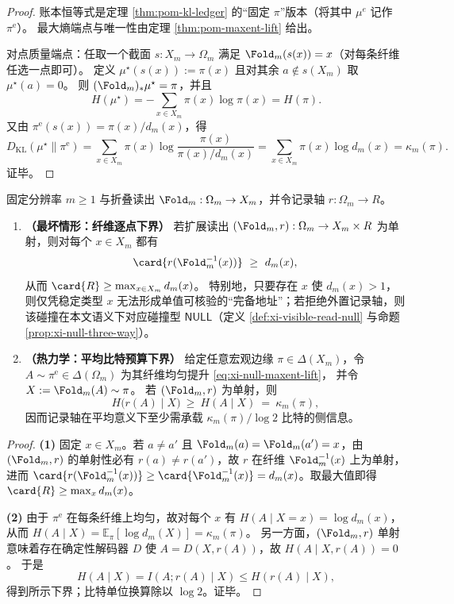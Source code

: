 \begin{proof}
账本恒等式是定理 \ref{thm:pom-kl-ledger} 的“固定 \(\pi\)”版本（将其中 \(\mu^e\) 记作 \(\pi^{\mathrm{e}}\)）。
最大熵端点与唯一性由定理 \ref{thm:pom-maxent-lift} 给出。
\par
对点质量端点：任取一个截面 \(s:X_m\to\Omega_m\) 满足 \(\Fold_m(s(x))=x\)（对每条纤维任选一点即可）。
定义
\(
\mu^\star(s(x)):=\pi(x)
\)
且对其余 \(a\notin s(X_m)\) 取 \(\mu^\star(a)=0\)。
则 \((\Fold_m)_*\mu^\star=\pi\)，并且
\[
H(\mu^\star)=-\sum_{x\in X_m}\pi(x)\log\pi(x)=H(\pi).
\]
又由 \(\pi^{\mathrm{e}}(s(x))=\pi(x)/d_m(x)\)，得
\[
D_{\mathrm{KL}}(\mu^\star\|\pi^{\mathrm{e}})
=\sum_{x\in X_m}\pi(x)\log\frac{\pi(x)}{\pi(x)/d_m(x)}
=\sum_{x\in X_m}\pi(x)\log d_m(x)
=\kappa_m(\pi).
\]
证毕。
\end{proof}

\begin{theorem}\label{thm:address-defect-law}
固定分辨率 \(m\ge 1\) 与折叠读出 \(\Fold_m:\Omega_m\to X_m\)，并令记录轴 \(r:\Omega_m\to R\)。
\begin{enumerate}
  \item \textbf{（最坏情形：纤维逐点下界）}
  若扩展读出 \((\Fold_m,r):\Omega_m\to X_m\times R\) 为单射，则对每个 \(x\in X_m\) 都有
  \[
  \card{r(\Fold_m^{-1}(x))}\ \ge\ d_m(x),
  \]
  从而 \(\card{R}\ge \max_{x\in X_m} d_m(x)\)。
  特别地，只要存在 \(x\) 使 \(d_m(x)>1\)，则仅凭稳定类型 \(x\) 无法形成单值可核验的“完备地址”；若拒绝外置记录轴，则该碰撞在本文语义下对应碰撞型 \(\mathsf{NULL}\)（定义 \ref{def:xi-visible-read-null} 与命题 \ref{prop:xi-null-three-way}）。

  \item \textbf{（热力学：平均比特预算下界）}
  给定任意宏观边缘 \(\pi\in\Delta(X_m)\)，令 \(A\sim\pi^{\mathrm{e}}\in\Delta(\Omega_m)\) 为其纤维均匀提升 \eqref{eq:xi-null-maxent-lift}，
  并令 \(X:=\Fold_m(A)\sim\pi\)。
  若 \((\Fold_m,r)\) 为单射，则
  \[
  H\bigl(r(A)\mid X\bigr)\ \ge\ H(A\mid X)\ =\ \kappa_m(\pi),
  \]
  因而记录轴在平均意义下至少需承载 \(\kappa_m(\pi)/\log 2\) 比特的侧信息。
\end{enumerate}
\end{theorem}

\begin{proof}
\textbf{(1)} 固定 \(x\in X_m\)。若 \(a\neq a'\) 且 \(\Fold_m(a)=\Fold_m(a')=x\)，由 \((\Fold_m,r)\) 的单射性必有 \(r(a)\neq r(a')\)，故 \(r\) 在纤维 \(\Fold_m^{-1}(x)\) 上为单射，进而 \(\card{r(\Fold_m^{-1}(x))}\ge \card{\Fold_m^{-1}(x)}=d_m(x)\)。取最大值即得 \(\card{R}\ge \max_x d_m(x)\)。
\par
\textbf{(2)} 由于 \(\pi^{\mathrm{e}}\) 在每条纤维上均匀，故对每个 \(x\) 有
\(
H(A\mid X=x)=\log d_m(x)
\)，从而
\(
H(A\mid X)=\mathbb{E}_\pi[\log d_m(X)]=\kappa_m(\pi)
\)。
另一方面，\((\Fold_m,r)\) 单射意味着存在确定性解码器 \(D\) 使 \(A=D(X,r(A))\)，故 \(H(A\mid X,r(A))=0\)。
于是
\[
H(A\mid X)=I(A;r(A)\mid X)\le H(r(A)\mid X),
\]
得到所示下界；比特单位换算除以 \(\log 2\)。证毕。
\end{proof}

